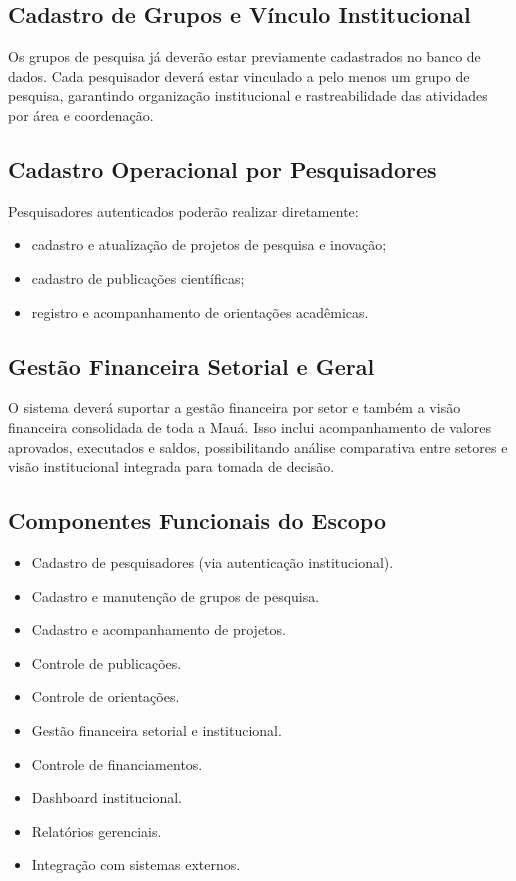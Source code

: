 \documentclass[12pt,a4paper]{article}
\begin{document}
\subsection{Cadastro de Grupos e Vínculo Institucional}
Os grupos de pesquisa já deverão estar previamente cadastrados no banco de dados. Cada pesquisador deverá estar vinculado a pelo menos um grupo de pesquisa, garantindo organização institucional e rastreabilidade das atividades por área e coordenação.

\subsection{Cadastro Operacional por Pesquisadores}
Pesquisadores autenticados poderão realizar diretamente:
\begin{itemize}[leftmargin=*]
  \item cadastro e atualização de projetos de pesquisa e inovação;
  \item cadastro de publicações científicas;
  \item registro e acompanhamento de orientações acadêmicas.
\end{itemize}

\subsection{Gestão Financeira Setorial e Geral}
O sistema deverá suportar a gestão financeira por setor e também a visão financeira consolidada de toda a Mauá. Isso inclui acompanhamento de valores aprovados, executados e saldos, possibilitando análise comparativa entre setores e visão institucional integrada para tomada de decisão.

\subsection{Componentes Funcionais do Escopo}
\begin{itemize}[leftmargin=*]
  \item Cadastro de pesquisadores (via autenticação institucional).
  \item Cadastro e manutenção de grupos de pesquisa.
  \item Cadastro e acompanhamento de projetos.
  \item Controle de publicações.
  \item Controle de orientações.
  \item Gestão financeira setorial e institucional.
  \item Controle de financiamentos.
  \item Dashboard institucional.
  \item Relatórios gerenciais.
  \item Integração com sistemas externos.
\end{itemize}
\end{document}
